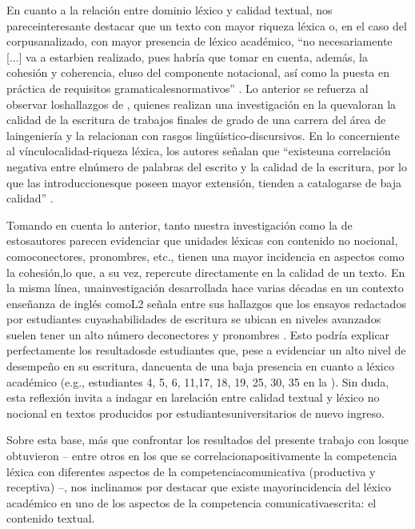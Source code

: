 \documentclass{textolivre}
\begin{document}
En cuanto a la relación entre dominio léxico y calidad textual, nos
pareceinteresante destacar que un texto con mayor riqueza léxica o, en el caso
del corpusanalizado, con mayor presencia de léxico académico, “no
necesariamente [...] va a estarbien realizado, pues habría que tomar en cuenta,
además, la cohesión y coherencia, eluso del componente notacional, así como la
puesta en práctica de requisitos gramaticalesnormativos” \cite[p. 145]{madrigal2016}.
Lo anterior se refuerza al observar loshallazgos de
\textcite{LilloFuentes2020}, quienes realizan una investigación en la
quevaloran la calidad de la escritura de trabajos finales de grado de una
carrera del área de laingeniería y la relacionan con rasgos
lingüístico-discursivos. En lo concerniente al vínculocalidad-riqueza léxica,
los autores señalan que “existeuna correlación negativa entre elnúmero de
palabras del escrito y la calidad de la escritura, por lo que las
introduccionesque poseen mayor extensión, tienden a catalogarse de baja
calidad” \cite[p. 11]{LilloFuentes2020}.

Tomando en cuenta lo anterior, tanto nuestra investigación como la de
estosautores parecen evidenciar que unidades léxicas con contenido no nocional,
comoconectores, pronombres, etc., tienen una mayor incidencia en aspectos como
la cohesión,lo que, a su vez, repercute directamente en la calidad de un texto.
En la misma línea, unainvestigación desarrollada hace varias décadas en un
contexto enseñanza de inglés comoL2 señala entre sus hallazgos que los ensayos
redactados por estudiantes cuyashabilidades de escritura se ubican en niveles
avanzados suelen tener un alto número deconectores y pronombres \cite{Reid1992}.
Esto podría explicar perfectamente los resultadosde estudiantes que, pese a
evidenciar un alto nivel de desempeño en su escritura, dancuenta de una baja
presencia en cuanto a léxico académico (e.g., estudiantes 4, 5, 6, 11,17, 18,
19, 25, 30, 35 en la ). Sin duda, esta reflexión invita a indagar en
larelación entre calidad textual y léxico no nocional en textos producidos por
estudiantesuniversitarios de nuevo ingreso.

Sobre esta base, más que confrontar los resultados del presente trabajo con
losque obtuvieron \textcite{RiffoOcares2014,Giammatteo2003,GonzaloZapico2016,Wood2019}
– entre otros en los que se
correlacionapositivamente la competencia léxica con diferentes aspectos de la
competenciacomunicativa (productiva y receptiva) –, nos inclinamos por destacar
que existe mayorincidencia del léxico académico en uno de los aspectos de la
competencia comunicativaescrita: el contenido textual.
\end{document}
